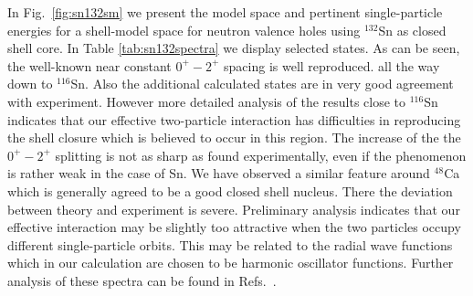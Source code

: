 \documentclass[twoside,12pt]{article}
\begin{document}
In Fig.~\ref{fig:sn132sm} we present the model space and pertinent single-particle energies
for a shell-model space for neutron valence holes using $^{132}$Sn as closed shell core.
In Table \ref{tab:sn132spectra} we display  
selected states. 
As can be seen, 
the well-known
near constant $0^{+} - 2^{+}$ spacing is well reproduced.
all the way down to
$^{116}$Sn.
Also the additional calculated states are in very good agreement
with experiment. However more detailed analysis of
the results close to $^{116}$Sn
indicates that our effective two-particle interaction
has difficulties in reproducing
the shell closure which is believed to occur in this region.
The increase of the
the $0^{+} - 2^{+}$ splitting is not as sharp as found
experimentally, even if the
phenomenon is rather weak in the case of Sn.
We have observed a similar feature around $^{48}$Ca \cite{hko95}
which is generally agreed
to be a good closed shell nucleus. There the deviation
between theory and experiment
is severe. Preliminary analysis indicates that our effective interaction
may be slightly too attractive when the two particles
occupy different single-particle orbits.
This may be related to the radial wave functions which in our calculation are
chosen to be harmonic oscillator functions. Further analysis of these spectra
can be found in Refs.~\cite{ehho98,haavard2004}.
\end{document}
